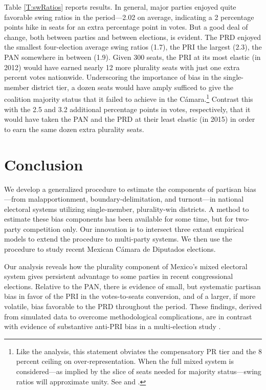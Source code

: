 \documentclass[letter,12pt]{article}
\begin{document}
{Table \ref{T:swRatios} reports results. In general, major parties enjoyed quite favorable swing ratios in the period---2.02 on average, indicating a 2 percentage points hike in seats for an extra percentage point in votes. But a good deal of change, both between parties and between elections, is evident. The PRD enjoyed the smallest four-election average swing ratios (1.7), the PRI the largest (2.3), the PAN somewhere in between (1.9). Given 300 seats, the PRI at its most elastic (in 2012) would have earned nearly 12 more plurality seats with just one extra percent votes nationwide. Underscoring the importance of bias in the single-member district tier, a dozen seats would have amply sufficed to give the coalition majority status that it failed to achieve in the C\'amara.\footnote{Like the analysis, this statement obviates the compensatory PR tier and the 8 percent ceiling on over-representation. When the full mixed system is considered---as implied by the slice of seats needed for majority status---swing ratios will approximate unity. See \citet{weldonMixedMemberSys2001} and \citet{marquez.aparicio.2010}.} Contrast this with the 2.5 and 3.2 additional percentage points in votes, respectively, that it would have taken the PAN and the PRD at their least elastic (in 2015) in order to earn the same dozen extra plurality seats. 



\section{Conclusion}

We develop a generalized procedure to estimate the components of partisan bias---from malapportionment, boundary-delimitation, and  turnout---in national electoral systems utilizing single-member, plurality-win districts. A method to estimate these bias components has been available for some time, but for two-party competition only. Our innovation is to intersect three extant empirical models to extend the procedure to multi-party systems. We then use the procedure to study recent Mexican C\'amara de Diputados elections. 

Our analysis reveals how the plurality component of Mexico's mixed electoral system gives persistent advantage to some parties in recent congressional elections. Relative to the PAN, there is evidence of small, but systematic partisan bias in favor of the PRI in the votes-to-seats conversion, and of a larger, if more volatile, bias favorable to the PRD throughout the period. These findings, derived from simulated data to overcome methodological complications, are in contrast with evidence of substantive anti-PRI bias in a multi-election study \citep{marquez2014biasBlog}. 

}
\end{document}
